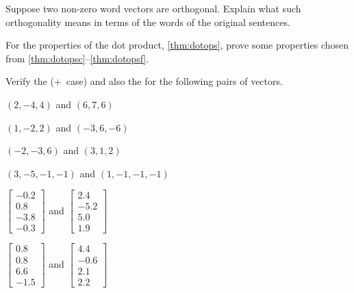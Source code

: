 \begin{exercise} \label{ex:} 
Suppose two non-zero word vectors are orthogonal.  
Explain what such orthogonality means in terms of the words of the original sentences.
\end{exercise}






\begin{exercise} \label{ex:dotops} 
For the properties of the dot product, \autoref{thm:dotops}, prove some properties chosen from \ref{thm:dotopsc}--\ref{thm:dotopsf}.
\end{exercise}



\begin{exercise} \label{ex:} 
Verify the  (\(+\)~case) and also the  for the following pairs of vectors.
\begin{parts}
\item \((2,-4,4)\) and \((6,7,6)\)
\item \((1,-2,2)\) and \((-3,6,-6)\)
\item \((-2,-3,6)\) and \((3,1,2)\)
\item \((3,-5,-1,-1)\) and \((1,-1,-1,-1)\)
\item \(\begin{bmatrix} -0.2\\0.8\\-3.8\\-0.3 \end{bmatrix}\) and 
\(\begin{bmatrix} 2.4\\-5.2\\5.0\\1.9 \end{bmatrix}\)
\item \(\begin{bmatrix} 0.8\\0.8\\6.6\\-1.5 \end{bmatrix}\) and 
\(\begin{bmatrix} 4.4\\-0.6\\2.1\\2.2 \end{bmatrix}\)
\end{parts}
\end{exercise}


